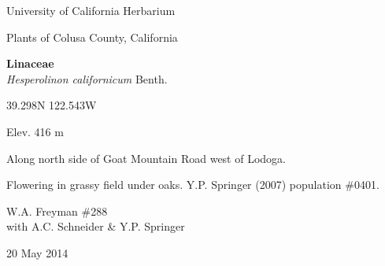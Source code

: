 \documentclass[letterpaper,10pt]{article}
\begin{document}
\begin{minipage}[t]{0.40\textwidth}

\begin{center}
University of California Herbarium \\
\begin{large}
Plants of Colusa County, California \\
\end{large}
\vspace{\baselineskip}
\textbf{Linaceae} \\
\textit{Hesperolinon californicum} Benth.\\
\end{center}

\begin{footnotesize}

\begin{multicols}{2}
39.298\textdegree N 122.543\textdegree W
\columnbreak
\begin{flushright}
Elev. 416 m
\end{flushright}
\end{multicols}

Along north side of Goat Mountain Road west of Lodoga.
\vspace{\baselineskip}

Flowering in grassy field under oaks. Y.P. Springer (2007) population \#0401.

\begin{multicols}{2}
W.A. Freyman \#288 \\
with A.C. Schneider \& Y.P. Springer
\columnbreak
\begin{flushright}
20 May 2014
\end{flushright}
\end{multicols}

\end{footnotesize}

\end{minipage}
%
\hspace{2cm}
%
\end{document}
